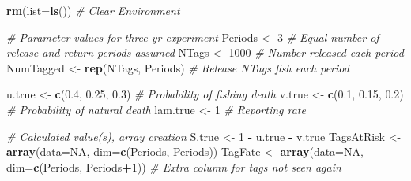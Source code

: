\documentclass[
]{krantz}
\makeatletter
\newenvironment{Shaded}{\begin{snugshade}}{\end{snugshade}}
\newcommand{\AttributeTok}[1]{\textcolor[rgb]{0.27,0.27,0.27}{#1}}
\newcommand{\CommentTok}[1]{\textcolor[rgb]{0.37,0.37,0.37}{\textit{#1}}}
\newcommand{\ConstantTok}[1]{\textcolor[rgb]{0.37,0.37,0.37}{#1}}
\newcommand{\DecValTok}[1]{\textcolor[rgb]{0.06,0.06,0.06}{#1}}
\newcommand{\FloatTok}[1]{\textcolor[rgb]{0.06,0.06,0.06}{#1}}
\newcommand{\FunctionTok}[1]{\textcolor[rgb]{0.27,0.27,0.27}{\textbf{#1}}}
\newcommand{\NormalTok}[1]{#1}
\newcommand{\OtherTok}[1]{\textcolor[rgb]{0.37,0.37,0.37}{#1}}
\newcommand{\SpecialCharTok}[1]{\textcolor[rgb]{0.43,0.43,0.43}{\textbf{#1}}}
\newenvironment{kframe}{%
\medskip{}
\setlength{\fboxsep}{.8em}
 \def\at@end@of@kframe{}%
 \ifinner\ifhmode%
  \def\at@end@of@kframe{\end{minipage}}%
  \begin{minipage}{\columnwidth}%
 \fi\fi%
 \def\FrameCommand##1{\hskip\@totalleftmargin \hskip-\fboxsep
 \colorbox{shadecolor}{##1}\hskip-\fboxsep
     \hskip-\linewidth \hskip-\@totalleftmargin \hskip\columnwidth}%
 \MakeFramed {\advance\hsize-\width
   \@totalleftmargin\z@ \linewidth\hsize
   \@setminipage}}%
 {\par\unskip\endMakeFramed%
 \at@end@of@kframe}
\renewenvironment{Shaded}{\begin{kframe}}{\end{kframe}}
\makeatother
\begin{document}
\begin{Shaded}
\begin{Highlighting}[]
\FunctionTok{rm}\NormalTok{(}\AttributeTok{list=}\FunctionTok{ls}\NormalTok{()) }\CommentTok{\# Clear Environment}

\CommentTok{\# Parameter values for three{-}yr experiment}
\NormalTok{Periods }\OtherTok{\textless{}{-}} \DecValTok{3}  \CommentTok{\# Equal number of release and return periods assumed}
\NormalTok{NTags }\OtherTok{\textless{}{-}} \DecValTok{1000} \CommentTok{\# Number released each period}
\NormalTok{NumTagged }\OtherTok{\textless{}{-}} \FunctionTok{rep}\NormalTok{(NTags, Periods) }\CommentTok{\# Release NTags fish each period}

\NormalTok{u.true }\OtherTok{\textless{}{-}} \FunctionTok{c}\NormalTok{(}\FloatTok{0.4}\NormalTok{, }\FloatTok{0.25}\NormalTok{, }\FloatTok{0.3}\NormalTok{) }\CommentTok{\# Probability of fishing death}
\NormalTok{v.true }\OtherTok{\textless{}{-}} \FunctionTok{c}\NormalTok{(}\FloatTok{0.1}\NormalTok{, }\FloatTok{0.15}\NormalTok{, }\FloatTok{0.2}\NormalTok{) }\CommentTok{\# Probability of natural death}
\NormalTok{lam.true }\OtherTok{\textless{}{-}} \DecValTok{1}  \CommentTok{\# Reporting rate}

\CommentTok{\# Calculated value(s), array creation}
\NormalTok{S.true }\OtherTok{\textless{}{-}} \DecValTok{1} \SpecialCharTok{{-}}\NormalTok{ u.true }\SpecialCharTok{{-}}\NormalTok{ v.true}
\NormalTok{TagsAtRisk }\OtherTok{\textless{}{-}} \FunctionTok{array}\NormalTok{(}\AttributeTok{data=}\ConstantTok{NA}\NormalTok{, }\AttributeTok{dim=}\FunctionTok{c}\NormalTok{(Periods, Periods))}
\NormalTok{TagFate }\OtherTok{\textless{}{-}} \FunctionTok{array}\NormalTok{(}\AttributeTok{data=}\ConstantTok{NA}\NormalTok{, }\AttributeTok{dim=}\FunctionTok{c}\NormalTok{(Periods, Periods}\SpecialCharTok{+}\DecValTok{1}\NormalTok{))   }\CommentTok{\# Extra column for tags not seen again}


\end{Highlighting}
\end{Shaded}
\end{document}
